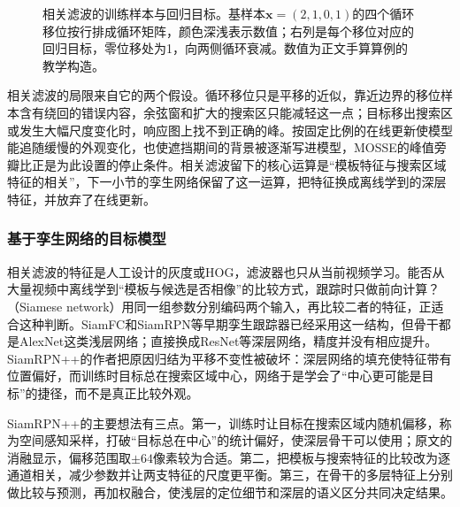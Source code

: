 \begin{figure}[htbp]
  \centering
  
  \caption{相关滤波的训练样本与回归目标。基样本$\bm{x}=(2,1,0,1)$的四个循环移位按行排成循环矩阵，颜色深浅表示数值；右列是每个移位对应的回归目标，零位移处为1，向两侧循环衰减。数值为正文手算算例的教学构造。}
  \label{fig:vision-circulant-shifts}
\end{figure}

相关滤波的局限来自它的两个假设。循环移位只是平移的近似，靠近边界的移位样本含有绕回的错误内容，余弦窗和扩大的搜索区只能减轻这一点；目标移出搜索区或发生大幅尺度变化时，响应图上找不到正确的峰。按固定比例的在线更新使模型能追随缓慢的外观变化，也使遮挡期间的背景被逐渐写进模型，MOSSE的峰值旁瓣比正是为此设置的停止条件。相关滤波留下的核心运算是“模板特征与搜索区域特征的相关”，下一小节的孪生网络保留了这一运算，把特征换成离线学到的深层特征，并放弃了在线更新。

\subsubsection{基于孪生网络的目标模型}
\label{sec:vision-video-siamrpn}

相关滤波的特征是人工设计的灰度或HOG，滤波器也只从当前视频学习。能否从大量视频中离线学到“模板与候选是否相像”的比较方式，跟踪时只做前向计算？（Siamese network）用同一组参数分别编码两个输入，再比较二者的特征，正适合这种判断。SiamFC和SiamRPN等早期孪生跟踪器已经采用这一结构，但骨干都是AlexNet这类浅层网络；直接换成ResNet等深层网络，精度并没有相应提升。SiamRPN++的作者把原因归结为平移不变性被破坏：深层网络的填充使特征带有位置偏好，而训练时目标总在搜索区域中心，网络于是学会了“中心更可能是目标”的捷径，而不是真正比较外观。

SiamRPN++的主要想法有三点。第一，训练时让目标在搜索区域内随机偏移，称为空间感知采样，打破“目标总在中心”的统计偏好，使深层骨干可以使用；原文的消融显示，偏移范围取$\pm64$像素较为合适。第二，把模板与搜索特征的比较改为逐通道相关，减少参数并让两支特征的尺度更平衡。第三，在骨干的多层特征上分别做比较与预测，再加权融合，使浅层的定位细节和深层的语义区分共同决定结果。

